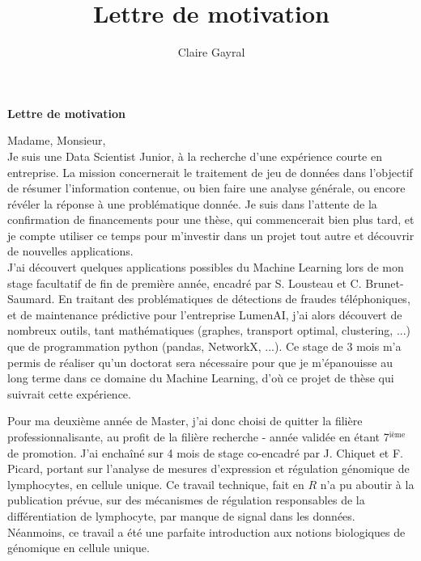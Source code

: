 \documentclass[a4paper,12pt]{article}
\title{Lettre de motivation}
\author{Claire Gayral}
\date{}
\begin{document}
{\centering \Large \bf Lettre de motivation \\ \vspace{0.6cm} }

Madame, Monsieur, 
\\

Je suis une Data Scientist Junior, à la recherche d'une expérience courte en entreprise. La mission concernerait le traitement de jeu de données dans l'objectif de résumer l'information contenue, ou bien faire une analyse générale, ou encore révéler la réponse à une problématique donnée. 
Je suis dans l'attente de la confirmation de financements pour une thèse, qui commencerait bien plus tard, et je compte utiliser ce temps pour m'investir dans un projet tout autre et découvrir de nouvelles applications. \\%

J'ai découvert quelques applications possibles du Machine Learning lors de mon stage facultatif de fin de première année, encadré par S. Lousteau et C. Brunet-Saumard.
En traitant des problématiques de détections de fraudes téléphoniques, et de maintenance prédictive pour l'entreprise LumenAI, j'ai alors découvert de nombreux outils, tant mathématiques (graphes, transport optimal, clustering, ...) que de programmation python (pandas, NetworkX, ...). 
Ce stage de 3 mois m'a permis de réaliser qu'un doctorat sera nécessaire pour que je m'épanouisse au long terme dans ce domaine du Machine Learning, d'où ce projet de thèse qui suivrait cette expérience. 

Pour ma deuxième année de Master, j'ai donc choisi de quitter la filière professionnalisante, au profit de la filière recherche - année validée en étant 7$^{\text{ième}}$ de promotion. 
J'ai enchaîné sur 4 mois de stage co-encadré par J. Chiquet et F. Picard, portant sur l'analyse de mesures d'expression et régulation génomique de lymphocytes, en cellule unique. Ce travail technique, fait en $R$ n'a pu aboutir à la publication prévue, sur des mécanismes de régulation responsables de la différentiation de lymphocyte, par manque de signal dans les données. Néanmoins, ce travail a été une parfaite introduction aux notions biologiques de génomique en cellule unique.
%
%
\end{document}

